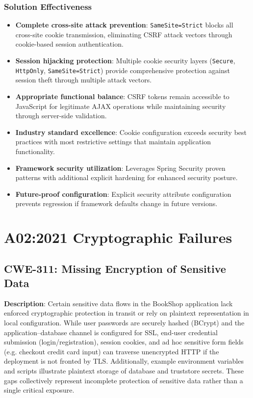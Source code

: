 \documentclass[]{UCD_CS_FYP_Report}
\begin{document}
\subsection{Solution Effectiveness}
\begin{itemize}
	\item \textbf{Complete cross-site attack prevention}: \texttt{SameSite=Strict} blocks all cross-site cookie transmission, eliminating CSRF attack vectors through cookie-based session authentication.
	\item \textbf{Session hijacking protection}: Multiple cookie security layers (\texttt{Secure}, \texttt{HttpOnly}, \texttt{SameSite=Strict}) provide comprehensive protection against session theft through multiple attack vectors.
	\item \textbf{Appropriate functional balance}: CSRF tokens remain accessible to JavaScript for legitimate AJAX operations while maintaining security through server-side validation.
	\item \textbf{Industry standard excellence}: Cookie configuration exceeds security best practices with most restrictive settings that maintain application functionality.
	\item \textbf{Framework security utilization}: Leverages Spring Security proven patterns with additional explicit hardening for enhanced security posture.
	\item \textbf{Future-proof configuration}: Explicit security attribute configuration prevents regression if framework defaults change in future versions.
\end{itemize}



\chapter{A02:2021 Cryptographic Failures}

\section{CWE-311: Missing Encryption of Sensitive Data}

	\textbf{Description}: Certain sensitive data flows in the BookShop application lack enforced cryptographic protection in transit or rely on plaintext representation in local configuration. While user passwords are securely hashed (BCrypt) and the application--database channel is configured for SSL, end-user credential submission (login/registration), session cookies, and ad hoc sensitive form fields (e.g. checkout credit card input) can traverse unencrypted HTTP if the deployment is not fronted by TLS. Additionally, example environment variables and scripts illustrate plaintext storage of database and truststore secrets. These gaps collectively represent incomplete protection of sensitive data rather than a single critical exposure.
\end{document}
